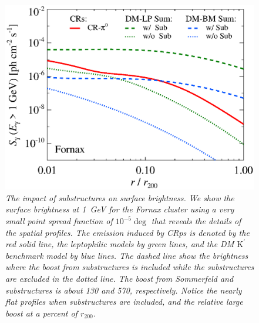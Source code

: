 \documentclass[10pt,aps,pra,reprint,amsmath,amsfonts,amssymb,showpacs]{revtex4-1}
\newcommand{\rmn}{\mathrm}
\newcommand{\Kp}{\rmn{K}^\prime}
\newcommand{\rvir}{r_{200}}
\begin{document}
\begin{figure}%
 \includegraphics[width=0.99\columnwidth]{figures/SB.resolved.v9.1GeV.SF300.noSuB.vs.SubMass.elmu.eps}
\caption{\it The impact of substructures on surface brightness. We
  show the surface brightness at 1~GeV for the Fornax cluster using a
  very small point spread function of $10^{-5}\deg$ that reveals the
  details of the spatial profiles. The emission induced by CRps is
  denoted by the red solid line, the leptophilic models by green
  lines, and the DM $\Kp$ benchmark model by blue lines. The dashed
  line show the brightness where the boost from substructures is
  included while the substructures are excluded in the dotted
  line. The boost from Sommerfeld and substructures is about 130 and
  570, respectively. Notice the nearly flat profiles when
  substructures are included, and the relative large boost at a
  percent of $\rvir$.}
 \label{fig:SB_sub}
\end{figure}
\end{document}
